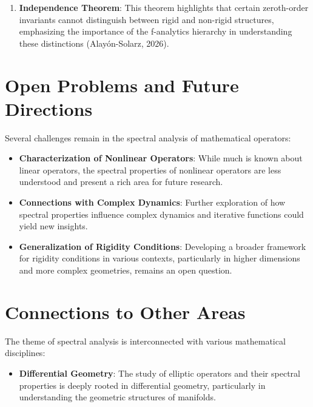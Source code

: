 \documentclass[11pt,a4paper]{article}
\begin{document}
\begin{enumerate}
\item \textbf{Independence Theorem}: This theorem highlights that certain zeroth-order invariants cannot distinguish between rigid and non-rigid structures, emphasizing the importance of the f-analytics hierarchy in understanding these distinctions (Alayón-Solarz, 2026).
\end{enumerate}

\section{Open Problems and Future Directions}
Several challenges remain in the spectral analysis of mathematical operators:

\begin{itemize}
\item \textbf{Characterization of Nonlinear Operators}: While much is known about linear operators, the spectral properties of nonlinear operators are less understood and present a rich area for future research.
\end{itemize}

\begin{itemize}
\item \textbf{Connections with Complex Dynamics}: Further exploration of how spectral properties influence complex dynamics and iterative functions could yield new insights.
\end{itemize}

\begin{itemize}
\item \textbf{Generalization of Rigidity Conditions}: Developing a broader framework for rigidity conditions in various contexts, particularly in higher dimensions and more complex geometries, remains an open question.
\end{itemize}

\section{Connections to Other Areas}
The theme of spectral analysis is interconnected with various mathematical disciplines:

\begin{itemize}
\item \textbf{Differential Geometry}: The study of elliptic operators and their spectral properties is deeply rooted in differential geometry, particularly in understanding the geometric structures of manifolds.
\end{itemize}
\end{document}
